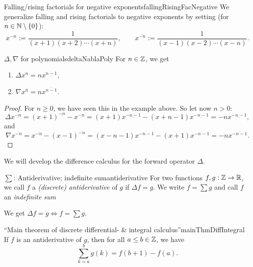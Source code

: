 \documentclass[language=english]{../../Template/TemplateLecture}
\begin{document}
\begin{defi}{Falling/rising factorials for negative exponents}{fallingRisingFacNegative}
    We generalize falling and rising factorials to negative exponents by setting (for $n \in \mathbb{N} \setminus \{0\}$):
    \begin{equation}
        x^{\underline{-n}} := \frac{1}{(x+1)(x+2)\cdots(x+n)}, \quad \quad x^{\overline{-n}} := \frac{1}{(x-1)(x-2)\cdots(x-n)}.
    \end{equation}
\end{defi}

\begin{thm}{$\Delta, \nabla$ for polynomials}{deltaNablaPoly}
    For $n \in \mathbb{Z}$, we get 
    \begin{enumerate}[$(i)$]
        \item $\Delta x^{\underline{n}} = nx^{\underline{n-1}}$,
        \item $\nabla x^{\overline{n}}  = nx^{\overline{n-1}}$.
    \end{enumerate}
\end{thm}
\begin{proof}
    For $n \geq 0$, we have seen this in the example above. So let now $n > 0$:
    \begin{equation}
        \Delta x^{\underline{-n}} = (x + 1)^{\underline{-n}} - x^{\underline{-n}} = (x+1)x^{\underline{-n-1}} - (x+n-1)x^{\underline{-n-1}} = -n x^{\underline{-n-1}},
    \end{equation}
    and 
    \begin{equation}
        \nabla x^{\overline{-n}} = x^{\overline{-n}} - (x-1)^{\overline{-n}} = (x - n - 1)x^{\overline{-n-1}} - (x+1)x^{\overline{-n-1}} = -n x^{\overline{-n-1}}.
    \end{equation}
\end{proof}

We will develop the difference calculus for the forward operator $\Delta$.

\begin{defi}{$\sum$: Antiderivative; indefinite sum}{antiderivative}
    For two functions $f, g: \mathbb{Z} \to \mathbb{R}$, we call $f$ a \emph{(discrete) antiderivative} of $g$ if $\Delta f = g$. We write $f = \sum g$ and call $f$ an \emph{indefinite sum}
\end{defi}
We get $\Delta f = g \iff f = \sum g$.

\begin{thm}{\enquote{Main theorem of discrete differential- \& integral calculus}}{mainThmDiffIntegral}
    If $f$ is an antiderivative of $g$, then for all $a \leq b \in \mathbb{Z}$, we have
    \begin{equation}
        \sum_{k = a}^b g(k) = f(b + 1) - f(a).
    \end{equation} 
\end{thm}
\end{document}
